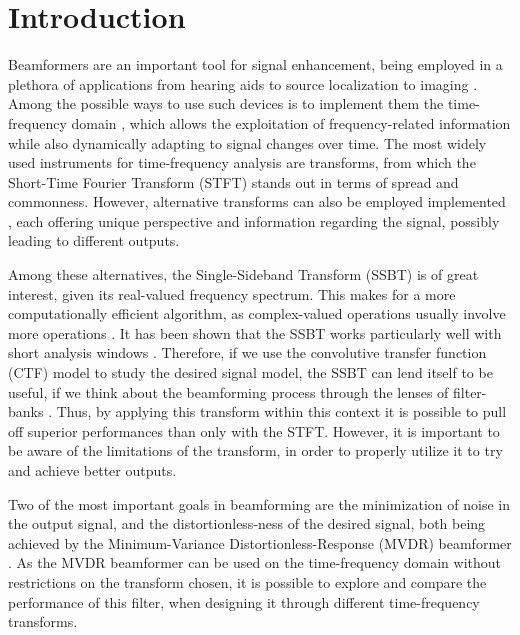 \section{Introduction}
\label{sec:introduction}

Beamformers are an important tool for signal enhancement, being employed in a plethora of applications from hearing aids \cite{lobato_worst-case-optimization_2020} to source localization \cite{chen_source_2002} to imaging \cite{lu_biomedical_1994,nguyen_minimum_2017}. Among the possible ways to use such devices is to implement them the time-frequency domain \cite{benesty_fundamentals_2017}, which allows the exploitation of frequency-related information while also dynamically adapting to signal changes over time. The most widely used instruments for time-frequency analysis are transforms, from which the Short-Time Fourier Transform (STFT) \cite{kiymik_comparison_2005,pan_microphone_2021} stands out in terms of spread and commonness. However, alternative transforms can also be employed implemented \cite{chen_wavelet-based_2018,yang_general_2014,almeida_fractional_1994}, each offering unique perspective and information regarding the signal, possibly leading to different outputs.

Among these alternatives, the Single-Sideband Transform (SSBT) \cite{crochiere_multirate_1983,oyzerman_speech_2012} is of great interest, given its real-valued frequency spectrum. This makes for a more computationally efficient algorithm, as complex-valued operations usually involve more operations \cite{???}. It has been shown that the SSBT works particularly well with short analysis windows \cite{crochiere_multirate_1983}. Therefore, if we use the convolutive transfer function (CTF) model \cite{talmon_relative_2009} to study the desired signal model, the SSBT can lend itself to be useful, if we think about the beamforming process through the lenses of filter-banks \cite{kumatani_filter_2008,gopinath_tutorial_1993}. Thus, by applying this transform within this context it is possible to pull off superior performances than only with the STFT. However, it is important to be aware of the limitations of the transform, in order to properly utilize it to try and achieve better outputs.

Two of the most important goals in beamforming are the minimization of noise in the output signal, and the distortionless-ness of the desired signal, both being achieved by the Minimum-Variance Distortionless-Response (MVDR) beamformer \cite{capon_high-resolution_1969,erdogan_improved_2016}. As the MVDR beamformer can be used on the time-frequency domain without restrictions on the transform chosen, it is possible to explore and compare the performance of this filter, when designing it through different time-frequency transforms.

